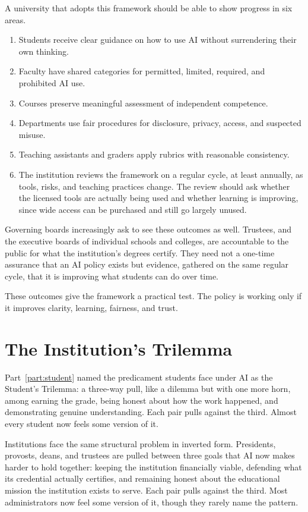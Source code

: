\documentclass{SIAMbook2023}
\begin{document}
A university that adopts this framework should be able to show progress in six areas.

\begin{enumerate}
  \item Students receive clear guidance on how to use AI without surrendering their own thinking.
  \item Faculty have shared categories for permitted, limited, required, and prohibited AI use.
  \item Courses preserve meaningful assessment of independent competence.
  \item Departments use fair procedures for disclosure, privacy, access, and suspected misuse.
  \item Teaching assistants and graders apply rubrics with reasonable consistency.
  \item The institution reviews the framework on a regular cycle, at least annually, as tools, risks, and teaching practices change. The review should ask whether the licensed tools are actually being used and whether learning is improving, since wide access can be purchased and still go largely unused.
\end{enumerate}

Governing boards increasingly ask to see these outcomes as well. Trustees, and the executive boards of individual schools and colleges, are accountable to the public for what the institution's degrees certify. They need not a one-time assurance that an AI policy exists but evidence, gathered on the same regular cycle, that it is improving what students can do over time.

These outcomes give the framework a practical test. The policy is working only if it improves clarity, learning, fairness, and trust.

\section{The Institution's Trilemma}
\label{u:sec:trilemma}

Part~\ref{part:student} named the predicament students face under AI as the Student's Trilemma: a three-way pull, like a dilemma but with one more horn, among earning the grade, being honest about how the work happened, and demonstrating genuine understanding. Each pair pulls against the third. Almost every student now feels some version of it.

Institutions face the same structural problem in inverted form. Presidents, provosts, deans, and trustees are pulled between three goals that AI now makes harder to hold together: keeping the institution financially viable, defending what its credential actually certifies, and remaining honest about the educational mission the institution exists to serve. Each pair pulls against the third. Most administrators now feel some version of it, though they rarely name the pattern.
\end{document}

